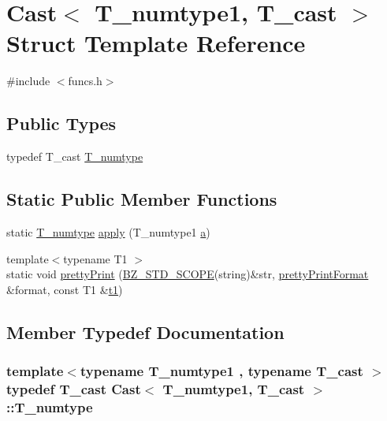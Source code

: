 \hypertarget{structCast}{}\section{Cast$<$ T\+\_\+numtype1, T\+\_\+cast $>$ Struct Template Reference}
\label{structCast}


{\ttfamily \#include $<$funcs.\+h$>$}

\subsection*{Public Types}
\begin{DoxyCompactItemize}
\item 
typedef T\+\_\+cast \hyperlink{structCast_aabcf07d7ccf230899d56be7370739507}{T\+\_\+numtype}
\end{DoxyCompactItemize}
\subsection*{Static Public Member Functions}
\begin{DoxyCompactItemize}
\item 
static \hyperlink{structCast_aabcf07d7ccf230899d56be7370739507}{T\+\_\+numtype} \hyperlink{structCast_a101cf3031511e6a66685ff80f61ed677}{apply} (T\+\_\+numtype1 \hyperlink{gen__mat5files_8m_aae328bf20413f220e38aec4d95bfd6da}{a})
\item 
{\footnotesize template$<$typename T1 $>$ }\\static void \hyperlink{structCast_aa8b70feddb2f3b88cfdb3bb7085c76c6}{pretty\+Print} (\hyperlink{numinquire_8h_a2b24ffc3b4ef9803956bc7715c6c7b83}{B\+Z\+\_\+\+S\+T\+D\+\_\+\+S\+C\+O\+P\+E}(string)\&str, \hyperlink{classprettyPrintFormat}{pretty\+Print\+Format} \&format, const T1 \&\hyperlink{sparse_2linalg_2eigen_2arpack_2ARPACK_2SRC_2stat_8h_af377a4e2b03dbeb6590856bdfca3df30}{t1})
\end{DoxyCompactItemize}


\subsection{Member Typedef Documentation}
\hypertarget{structCast_aabcf07d7ccf230899d56be7370739507}{}
\subsubsection[{T\+\_\+numtype}]{\setlength{\rightskip}{0pt plus 5cm}template$<$typename T\+\_\+numtype1 , typename T\+\_\+cast $>$ typedef T\+\_\+cast {\bf Cast}$<$ T\+\_\+numtype1, T\+\_\+cast $>$\+::{\bf T\+\_\+numtype}}\label{structCast_aabcf07d7ccf230899d56be7370739507}


